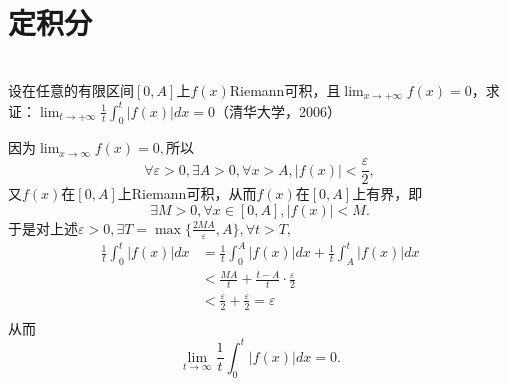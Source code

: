   \section{定积分}
  \begin{example}
  \hfill\\
  设在任意的有限区间$[0,A]$上$f(x)$Riemann可积，且$\displaystyle\lim_{x\rightarrow+\infty}f(x)=0$，求证：$\displaystyle\lim_{t\rightarrow+\infty}\frac 1t\int_0^t|f(x)|dx=0$（清华大学，2006）
  
  
  因为$\lim_{x\rightarrow\infty}f(x)=0,$所以$$\forall\varepsilon>0,\exists A>0,\forall x>A,|f(x)|<\frac{\varepsilon}{2},$$
  又$f(x)$在$[0,A]$上Riemann可积，从而$f(x)$在$[0,A]$上有界，即$$\exists M>0,\forall x\in[0,A],|f(x)|<M.$$
  于是对上述$\varepsilon>0,\exists T=\max\{\frac{2MA}{\varepsilon},A\},\forall t>T,$
  $$
  \begin{aligned}
  \frac{1}{t}\int_0^t|f(x)|dx&=\frac1t\int_0^A|f(x)|dx+\frac1t\int_A^t|f(x)|dx\\
  &<\frac{MA}{t}+\frac{t-A}{t}\cdot\frac{\varepsilon}{2}\\
  &<\frac{\varepsilon}{2}+\frac{\varepsilon}{2}=\varepsilon\\
  \end{aligned}
  $$
  从而$$\lim_{t\rightarrow\infty}\frac{1}{t}\int_0^t|f(x)|dx=0.$$
  \end{example}
